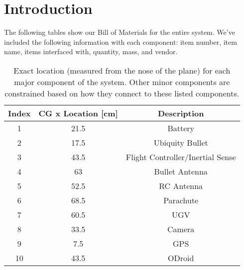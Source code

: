 \documentclass[]{auvsi_doc}
\begin{document}
	\begin{AUVSITitlePage}
		\begin{artifacttable}
		\end{artifacttable}
	\end{AUVSITitlePage}

	\section{Introduction}
	The following tables show our Bill of Materials for the entire system. We've included the following information with each component: item number, item name, items interfaced with, quantity, mass, and vendor.


	\begin{table}[h!]
		\begin{center}
			\caption{Exact location (measured from the nose of the plane) for each major component of the system. Other minor components are constrained based on how they connect to these listed components.}
			\label{table:comps-placement}
			\begin{tabular}{c c c} 
				\toprule
				Index & CG x Location [cm] & Description \\
				\midrule
				1 & 21.5 & Battery \\
				2 & 17.5 & Ubiquity Bullet \\
				3 & 43.5 & Flight Controller/Inertial Sense \\
				4 & 63 & Bullet Antenna \\
				5 & 52.5 & RC Antenna \\
				6 & 68.5 & Parachute \\
				7 & 60.5 & UGV \\
				8 & 33.5 & Camera \\
				9 & 7.5 & GPS \\
				10 & 43.5 &ODroid \\
				\bottomrule
			\end{tabular}
		\end{center}
	\end{table}
\end{document}
